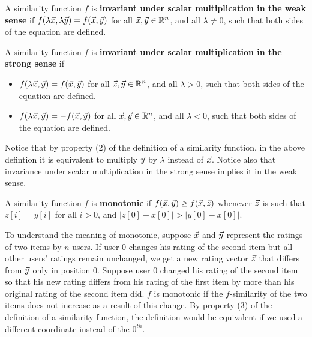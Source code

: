 \documentclass{article}
\newcommand{\skipsmall}{\vspace{1em}}
\begin{document}
\begin{definition} 
A similarity function $f$ is 
\textbf{invariant under scalar multiplication in the weak sense} if 
$f(\lambda\vec{x},\lambda\vec{y})=f(\vec{x},\vec{y})$ 
for all $\vec{x},\vec{y}\in\mathbb{R}^{n}$, and all $\lambda\not=0$, such that
both sides of the equation are defined.
\end{definition}

\begin{definition} 
A similarity function $f$ is 
\textbf{invariant under scalar multiplication in the strong sense} if 
\begin{itemize}
  \item $f(\lambda\vec{x},\vec{y})=f(\vec{x},\vec{y})$ 
  for all $\vec{x},\vec{y}\in\mathbb{R}^{n}$, and all $\lambda>0$, such that both sides of
  the equation are defined.
  \item $f(\lambda\vec{x},\vec{y})= -f(\vec{x},\vec{y})$ 
  for all $\vec{x},\vec{y}\in\mathbb{R}^{n}$, and all $\lambda<0$, such that both sides of
  the equation are defined.
\end{itemize}
\end{definition}

Notice that by property (2) of the definition of a similarity function, in the
above defintion it is equivalent to multiply $\vec{y}$ by
$\lambda$ instead of $\vec{x}$. Notice also that invariance
under scalar multiplication in the strong sense implies it in the weak sense.

\begin{definition}A similarity function $f$ is \textbf{monotonic} if
$f(\vec{x},\vec{y})\geq f(\vec{x},\vec{z})$ whenever $\vec{z}$ is such that
$z[i]=y[i]$ for all $i>0$, and $|z[0]-x[0]|>|y[0]-x[0]|$.
\end{definition}

To understand the meaning of monotonic, suppose $\vec{x}$ and $\vec{y}$ represent
the ratings of two items by $n$ users. If user $0$ changes his rating of the
second item but all other users' ratings remain unchanged, we get a new rating 
vector $\vec{z}$ that differs from $\vec{y}$ only in position $0$. Suppose user $0$
changed his rating of the second item so that his
new rating differs from his rating of the first item by more than his original
rating of the second item did. $f$ is monotonic if the $f$-similarity of the two
items does not increase as a result of this change. By property (3) of the
definition of a similarity function, the definition would be equivalent if we used
a different coordinate instead of the $0^{th}$.

\skipsmall
\end{document}
